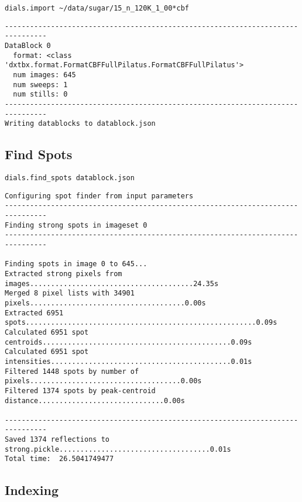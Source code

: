 \documentclass[a4paper, 11pt]{article}
\begin{document}
{\small
\begin{verbatim}
dials.import ~/data/sugar/15_n_120K_1_00*cbf 
\end{verbatim}
}

{\small
\begin{verbatim}
--------------------------------------------------------------------------------
DataBlock 0
  format: <class 'dxtbx.format.FormatCBFFullPilatus.FormatCBFFullPilatus'>
  num images: 645
  num sweeps: 1
  num stills: 0
--------------------------------------------------------------------------------
Writing datablocks to datablock.json
\end{verbatim}
}

\subsection{Find Spots}

{\small
\begin{verbatim}
dials.find_spots datablock.json 
\end{verbatim}
}

{\small
\begin{verbatim}
Configuring spot finder from input parameters
--------------------------------------------------------------------------------
Finding strong spots in imageset 0
--------------------------------------------------------------------------------

Finding spots in image 0 to 645...
Extracted strong pixels from images.......................................24.35s
Merged 8 pixel lists with 34901 pixels.....................................0.00s
Extracted 6951 spots.......................................................0.09s
Calculated 6951 spot centroids.............................................0.09s
Calculated 6951 spot intensities...........................................0.01s
Filtered 1448 spots by number of pixels....................................0.00s
Filtered 1374 spots by peak-centroid distance..............................0.00s

--------------------------------------------------------------------------------
Saved 1374 reflections to strong.pickle....................................0.01s
Total time:  26.5041749477
\end{verbatim}
}

\subsection{Indexing}
\end{document}
